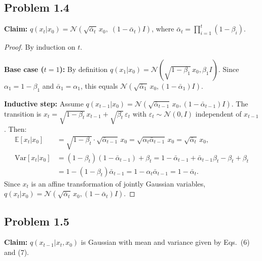 \documentclass[11pt]{article}
\begin{document}
\subsection*{Problem 1.4}

\textbf{Claim:} $q(x_t | x_0) = \mathcal{N}\!\left(\sqrt{\bar\alpha_t}\, x_0,\; (1 - \bar\alpha_t) I\right)$, where $\bar\alpha_t = \prod_{i=1}^t (1-\beta_i)$.

\begin{proof}
By induction on $t$.

\textbf{Base case ($t=1$):} By definition $q(x_1|x_0) = \mathcal{N}(\sqrt{1-\beta_1}\,x_0, \beta_1 I)$. Since $\alpha_1 = 1-\beta_1$ and $\bar\alpha_1 = \alpha_1$, this equals $\mathcal{N}(\sqrt{\bar\alpha_1}\,x_0, (1-\bar\alpha_1)I)$.

\textbf{Inductive step:} Assume $q(x_{t-1}|x_0) = \mathcal{N}(\sqrt{\bar\alpha_{t-1}}\,x_0, (1-\bar\alpha_{t-1})I)$. The transition is $x_t = \sqrt{1-\beta_t}\,x_{t-1} + \sqrt{\beta_t}\,\varepsilon_t$ with $\varepsilon_t \sim \mathcal{N}(0,I)$ independent of $x_{t-1}$. Then:
\begin{align*}
\mathbb{E}[x_t | x_0] &= \sqrt{1-\beta_t}\cdot\sqrt{\bar\alpha_{t-1}}\,x_0 = \sqrt{\alpha_t \bar\alpha_{t-1}}\,x_0 = \sqrt{\bar\alpha_t}\,x_0, \\
\mathrm{Var}[x_t | x_0] &= (1-\beta_t)(1-\bar\alpha_{t-1}) + \beta_t = 1 - \bar\alpha_{t-1} + \bar\alpha_{t-1}\beta_t - \beta_t + \beta_t \\
&= 1 - (1-\beta_t)\bar\alpha_{t-1} = 1 - \alpha_t\bar\alpha_{t-1} = 1 - \bar\alpha_t.
\end{align*}
Since $x_t$ is an affine transformation of jointly Gaussian variables, $q(x_t|x_0) = \mathcal{N}(\sqrt{\bar\alpha_t}\,x_0, (1-\bar\alpha_t)I)$.
\end{proof}

\subsection*{Problem 1.5}

\textbf{Claim:} $q(x_{t-1}|x_t, x_0)$ is Gaussian with mean and variance given by Eqs.~(6) and (7).
\end{document}
